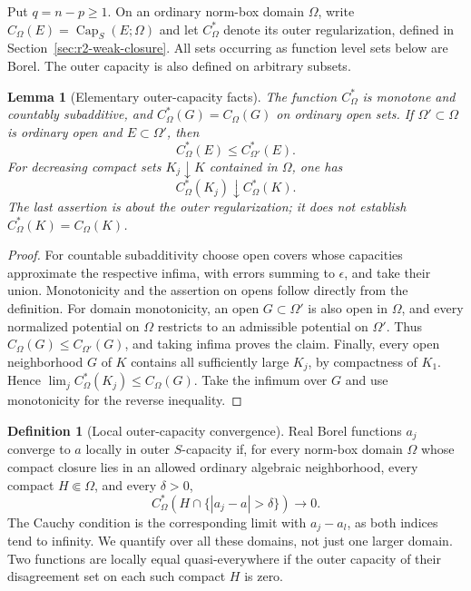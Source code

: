 \documentclass[11pt,a4paper]{article}
\numberwithin{equation}{section}
\newtheorem{lemma}[theorem]{Lemma}
\theoremstyle{definition}
\newtheorem{definition}[theorem]{Definition}
\theoremstyle{remark}
\begin{document}
Put $q=n-p\geq1$. On an ordinary norm-box domain $\Omega$, write
$C_\Omega(E)=\operatorname{Cap}_{S}(E;\Omega)$ and let
$C_\Omega^*$ denote its outer regularization, defined in
Section~\ref{sec:r2-weak-closure}. All sets occurring as function
level sets below are Borel. The outer capacity is also defined on
arbitrary subsets.

\begin{lemma}[Elementary outer-capacity facts]
\label{lem:r2-outer-facts}
The function $C_\Omega^*$ is monotone and countably subadditive,
and $C_\Omega^*(G)=C_\Omega(G)$ on ordinary open sets. If
$\Omega'\subset\Omega$ is ordinary open and $E\subset\Omega'$, then
\[
 C_\Omega^*(E)\leq C_{\Omega'}^*(E).
\]
For decreasing compact sets $K_j\downarrow K$ contained in
$\Omega$, one has
\[
 C_\Omega^*(K_j)\downarrow C_\Omega^*(K).
\]
The last assertion is about the outer regularization; it does not
establish $C_\Omega^*(K)=C_\Omega(K)$.
\end{lemma}

\begin{proof}
For countable subadditivity choose open covers whose capacities
approximate the respective infima, with errors summing to
$\epsilon$, and take their union. Monotonicity and the assertion
on opens follow directly from the definition. For domain
monotonicity, an open $G\subset\Omega'$ is also open in $\Omega$,
and every normalized potential on $\Omega$ restricts to an
admissible potential on $\Omega'$. Thus
$C_\Omega(G)\leq C_{\Omega'}(G)$, and taking infima proves the
claim. Finally, every open neighborhood $G$ of $K$ contains all
sufficiently large $K_j$, by compactness of $K_1$. Hence
$\lim_j C_\Omega^*(K_j)\leq C_\Omega(G)$. Take the infimum
over $G$ and use monotonicity for the reverse inequality.
\end{proof}

\begin{definition}[Local outer-capacity convergence]
\label{def:r2-outer-convergence}
Real Borel functions $a_j$ converge to $a$ locally in outer
$S$-capacity if, for every norm-box domain $\Omega$ whose compact
closure lies in an allowed ordinary algebraic neighborhood, every
compact $H\Subset\Omega$, and every $\delta>0$,
\[
 C_\Omega^*(H\cap\{|a_j-a|>\delta\})\longrightarrow0.
\]
The Cauchy condition is the corresponding limit with $a_j-a_l$,
as both indices tend to infinity. We quantify over all these
domains, not just one larger domain. Two functions are locally
equal quasi-everywhere if the outer capacity of their disagreement
set on each such compact $H$ is zero.
\end{definition}
\end{document}
